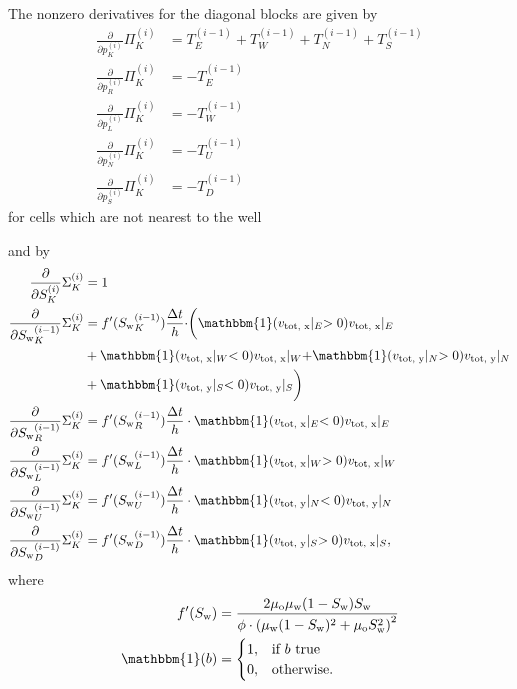 \documentclass[conference]{IEEEtran}
\newcommand*{\indicator}{\ensuremath{\mathbb{1}}}
\newcommand*{\pdiff}[2]{\ensuremath{\frac{\partial}{\partial{#2}}{#1}}}
\renewcommand*{\indicator}{\ensuremath{\mathbbm{1}}}
\begin{document}
The nonzero derivatives for the diagonal blocks are given by
\begin{align}
\pdiff{\Pi_K^{(i)}}{p_K^{(i)}} &= T_E^{(i-1)} + T_W^{(i-1)} + T_N^{(i-1)} + T_S^{(i-1)} \\
\pdiff{\Pi_K^{(i)}}{p_R^{(i)}} &= -T_E^{(i-1)} \\
\pdiff{\Pi_K^{(i)}}{p_L^{(i)}} &= -T_W^{(i-1)} \\
\pdiff{\Pi_K^{(i)}}{p_N^{(i)}} &= -T_U^{(i-1)} \\
\pdiff{\Pi_K^{(i)}}{p_S^{(i)}} &= -T_D^{(i-1)}
\end{align}
for cells which are not nearest to the well

and by
\begin{align}
\pdiff{\Sigma_K^{(i)}}{S_K^{(i)}} &= 1 \\
\pdiff{\Sigma_K^{(i)}}{{S_{\text{w}}}_K^{(i-1)}} &=  f^\prime({S_{\text{w}}}_K^{(i-1)}) \frac{\Delta t}{h}\cdot \biggr(\indicator(v_\text{tot, x}\lvert_E > 0) v_\text{tot, x}\lvert_E \\&+ \indicator(v_\text{tot, x}\lvert_W < 0) v_\text{tot, x}\lvert_W + \indicator(v_\text{tot, y}\lvert_N > 0) v_\text{tot, y}\lvert_N  \nonumber\\&+ \indicator(v_\text{tot, y}\lvert_S < 0) v_\text{tot, y}\lvert_S\biggr) \nonumber\\ 
\pdiff{\Sigma_K^{(i)}}{{S_{\text{w}}}_R^{(i-1)}} &= f^\prime({S_{\text{w}}}_R^{(i-1)}) \frac{\Delta t}{h}\cdot \indicator(v_\text{tot, x}\lvert_E < 0) v_\text{tot, x}\lvert_E \\
\pdiff{\Sigma_K^{(i)}}{{S_{\text{w}}}_L^{(i-1)}} &= f^\prime({S_{\text{w}}}_L^{(i-1)}) \frac{\Delta t}{h}\cdot \indicator(v_\text{tot, x}\lvert_W > 0) v_\text{tot, x}\lvert_W \\
\pdiff{\Sigma_K^{(i)}}{{S_{\text{w}}}_U^{(i-1)}} &= f^\prime({S_{\text{w}}}_U^{(i-1)}) \frac{\Delta t}{h}\cdot \indicator(v_\text{tot, y}\lvert_N < 0) v_\text{tot, y}\lvert_N \\
\pdiff{\Sigma_K^{(i)}}{{S_{\text{w}}}_D^{(i-1)}} &= f^\prime({S_{\text{w}}}_D^{(i-1)}) \frac{\Delta t}{h}\cdot \indicator(v_\text{tot, y}\lvert_S > 0) v_\text{tot, x}\lvert_S,
\end{align}
where
\begin{align}
f^\prime(S_\text{w}) &=  \frac{2\mu_\text{o}\mu_\text{w} (1 - S_\text{w})S_\text{w}}{\phi \cdot \left(\mu_\text{w}(1 - S_\text{w})^2 + \mu_\text{o}S_\text{w}^2\right)^2}\\
\indicator(b) &= \begin{cases} 1, &\text{if } b \text{ true} \\ 0, &\text{otherwise.}
\end{cases}
\end{align}
\end{document}
